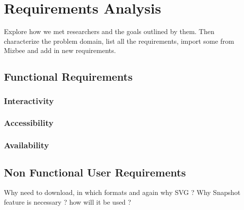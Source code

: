 \chapter{Requirements Analysis}

Explore how we met researchers and the goals outlined by them.
Then characterize the problem domain, list all the requirements,
import some from Mizbee and add in new requirements.

\section{Functional Requirements}

\subsection{Interactivity}

\subsection{Accessibility}

\subsection{Availability}

\section{Non Functional User Requirements}
Why need to download, in which formats and again why SVG ?
Why Snapshot feature is necessary ? how will it be used ?